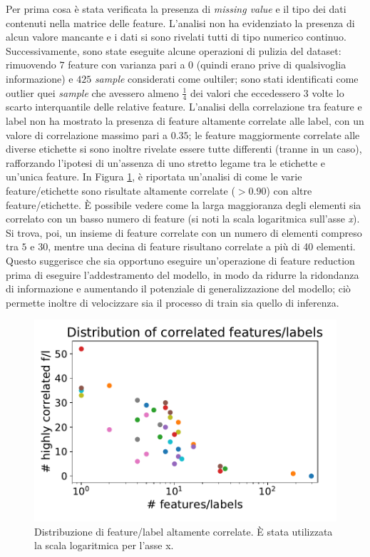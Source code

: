Per prima cosa è stata verificata la presenza di \textit{missing value} e il tipo dei dati contenuti nella matrice delle feature. L'analisi non ha evidenziato la presenza di alcun valore mancante e i dati si sono rivelati tutti di tipo numerico continuo. 
Successivamente, sono state eseguite alcune operazioni di pulizia del dataset: rimuovendo $7$ feature con varianza pari a $0$ (quindi erano prive di qualsivoglia informazione) e $425$ \textit{sample} considerati come oultiler; sono stati identificati come outlier quei \textit{sample} che avessero almeno $\frac{1}{4}$ dei valori che eccedessero $3$ volte lo scarto interquantile delle relative feature.
L'analisi della correlazione tra feature e label non ha mostrato la presenza di feature altamente correlate alle label, con un valore di correlazione massimo pari a $0.35$; le feature maggiormente correlate alle diverse etichette si sono inoltre rivelate essere tutte differenti (tranne in un caso), rafforzando l'ipotesi di un'assenza di uno stretto legame tra le etichette e un'unica feature.
In Figura \ref{fig:distributionhighcorr}, è riportata un'analisi di come le varie feature/etichette sono risultate altamente correlate ($> 0.90$) con altre feature/etichette. È possibile vedere come la larga maggioranza degli elementi sia correlato con un basso numero di feature (si noti la scala logaritmica sull'asse \textit{x}).
Si trova, poi, un insieme di feature correlate con un numero di elementi compreso tra $5$ e $30$, mentre una decina di feature risultano correlate a più di 40 elementi. Questo suggerisce che sia opportuno eseguire un'operazione di feature reduction prima di eseguire l'addestramento del modello, in modo da ridurre la ridondanza di informazione e aumentando il potenziale di generalizzazione del modello; ciò permette inoltre di velocizzare sia il processo di train sia quello di inferenza. 
\begin{figure}
	\centering
	\includegraphics[width=0.7\linewidth]{../images/pdf/distribution_high_corr}
	\caption{Distribuzione di feature/label altamente correlate. È stata utilizzata la scala logaritmica per l'asse x.}
	\label{fig:distributionhighcorr}
\end{figure}
